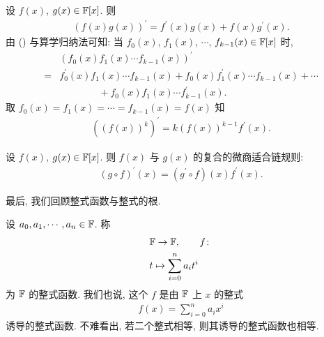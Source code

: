 \begin{proposition}
    设 $f(x)$, $g(x) \in \mathbb{F}[x]$. 则
    \begin{align*}
        (f(x) g(x))^{\prime} = f^{\prime} (x) g(x) + f(x) g^{\prime} (x). \tag*{(\myStar)}
    \end{align*}
    由 (\myStar) 与算学归纳法可知: 当 $f_0 (x)$, $f_1 (x)$, $\cdots$, $f_{k-1} (x) \in \mathbb{F}[x]$ 时,
    \begin{align*}
             & (f_0 (x) f_1 (x) \cdots f_{k-1} (x))^{\prime}                                                      \\
        = {} & f_0^{\prime} (x) f_1 (x) \cdots f_{k-1} (x) + f_0 (x) f_1^{\prime} (x) \cdots f_{k-1} (x) + \cdots \\
             & \qquad \qquad + f_0 (x) f_1 (x) \cdots f_{k-1}^{\prime} (x).
    \end{align*}
    取 $f_0 (x) = f_1 (x) = \cdots = f_{k-1} (x) = f(x)$ 知
    \begin{align*}
        ((f(x))^k)^{\prime} = k(f(x))^{k-1} f^{\prime} (x).
    \end{align*}
\end{proposition}

\begin{proposition}
    设 $f(x)$, $g(x) \in \mathbb{F}[x]$. 则 $f(x)$ 与 $g(x)$ 的复合的微商适合链规则:
    \begin{align*}
        (g \circ f)^{\prime} (x) = (g^{\prime} \circ f)(x) f^{\prime} (x).
    \end{align*}
\end{proposition}

最后, 我们回顾整式函数与整式的根.

\begin{definition}
    设 $a_0, a_1, \cdots, a_n \in \mathbb{F}$. 称
    \begin{align*}
         & \mathbb{F} \to \mathbb{F}, \tag*{$f \colon$}   \\
         & t \mapsto \sum_{i = 0}^n a_i t^i
    \end{align*}
    为 $\mathbb{F}$ 的整式函数. 我们也说, 这个 $f$ 是由 $\mathbb{F}$ 上 $x$ 的整式
    \begin{align*}
        f(x) = \sum_{i = 0}^n a_i x^i
    \end{align*}
    诱导的整式函数. 不难看出, 若二个整式相等, 则其诱导的整式函数也相等.
\end{definition}

